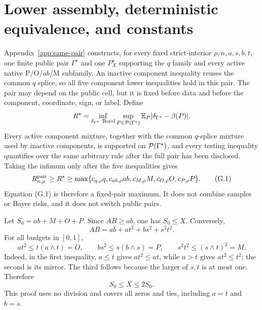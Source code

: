 \section{Lower assembly, deterministic equivalence, and constants}
\label{app:assembly}

Appendix~\ref{app:same-pair} constructs, for every fixed strict-interior
\(\rho,n,a,s,b,t\), one finite public pair \(\Gamma^\star\) and one
\(P_X^\star\) supporting the \(q\) family and every active native
P/O/\(ab\)/M subfamily.  An inactive component inequality reuses the common
\(q\) splice, so all five component lower inequalities hold in this pair.  The pair may depend
on the public cell, but it is fixed before data and before the component,
coordinate, sign, or label.  Define
\[
 R^\star=
 \inf_{\delta_{\Gamma^\star}\ {\rm Borel}}
 \sup_{P\in\mathcal P(\Gamma^\star)}
 \mathbb E_P\lvert \delta_{\Gamma^\star}-\beta(P)\rvert.
\]
Every active component mixture, together with the common \(q\)-splice
mixture used by inactive components, is supported on
\(\mathcal P(\Gamma^\star)\), and every
testing inequality quantifies over the same arbitrary rule after the full pair
has been disclosed.  Taking the infimum only after the five inequalities gives
\begin{equation}
 R^{\mathrm{pair}}_{n,\rho}\ge R^\star\ge
 \max\{c_{q,\rho}q,c_{ab,\rho}ab,
 c_{M,\rho}M,c_{O,\rho}O,c_{P,\rho}P\}.
 \tag{G.1}
\end{equation}
Equation (G.1) is therefore a fixed-pair maximum.  It does not combine
samples or Bayes risks, and it does not switch public pairs.

Let \(S_0=ab+M+O+P\).  Since \(AB\ge ab\), one has \(S_0\le X\).
Conversely,
\[
 AB=ab+at^2+bs^2+s^2t^2.
\]
For all budgets in \([0,1]\),
\[
 at^2\le t(a\wedge t)=O,\qquad
 bs^2\le s(b\wedge s)=P,\qquad
 s^2t^2\le(s\wedge t)^2=M.
\]
Indeed, in the first inequality, \(a\le t\) gives
\(at^2\le at\), while \(a>t\) gives \(at^2\le t^2\); the second is its
mirror.  The third follows because the larger of \(s,t\) is at most one.
Therefore
\begin{equation}
 S_0\le X\le2S_0.
 \tag{G.2}
\end{equation}
This proof uses no division and covers all zeros and ties, including
\(a=t\) and \(b=s\).

